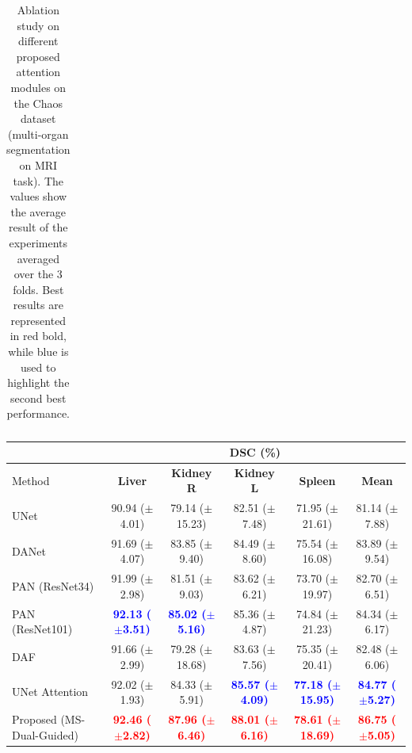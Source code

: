 \documentclass[journal]{IEEEtran}
\begin{document}
\begin{table}[ht!]
\begin{tabular}{lcccc|c}
\midrule
\end{tabular}
\caption{Ablation study on different proposed attention modules on the Chaos dataset (multi-organ segmentation on MRI task). The values show the average result of the experiments averaged over the 3 folds. Best results are represented in red bold, while blue is used to highlight the second best performance.}
\label{table:metrics_ablation_supplemental}
\end{table}

\begin{table}[t!]
\centering
\scriptsize
\begin{tabular}{lcccc|c}\\
\toprule
 & \multicolumn{5}{c}{\textbf{DSC} (\%)}\\
 \midrule
Method & \textbf{Liver} & \textbf{Kidney R} & \textbf{Kidney L} & \textbf{Spleen} & \textbf{Mean}  \\
 \midrule
UNet \cite{ronneberger2015u}  & 90.94 ($\pm$4.01)  & 79.14 ($\pm$15.23) & 82.51 ($\pm$7.48) & 71.95 ($\pm$21.61) &  81.14 ($\pm$7.88) \\
DANet \cite{fu2018dual}  & 91.69  ($\pm$4.07) & 83.85 ($\pm$9.40)& 84.49 ($\pm$8.60) & 75.54 ($\pm$16.08)&  83.89 ($\pm$9.54)   \\
PAN (ResNet34) \cite{li2018pyramid}   & 91.99 ($\pm$2.98)  & 81.51 ($\pm$9.03) & 83.62 ($\pm$6.21) & 73.70 ($\pm$19.97) & 82.70 ($\pm$6.51) \\
PAN (ResNet101)\cite{li2018pyramid}   & \textcolor{blue}{\textbf{92.13 ($\pm$3.51)}}  & \textcolor{blue}{\textbf{85.02 ($\pm$5.16)}} & 85.36 ($\pm$4.87) & 74.84 ($\pm$21.23) & 84.34 ($\pm$6.17) \\
DAF \cite{wang18d}  &  91.66 ($\pm$2.99) & 79.28 ($\pm$18.68)& 83.63 ($\pm$7.56) &  75.35 ($\pm$20.41)&  82.48 ($\pm$6.06)   \\
UNet Attention \cite{schlemper2019attention}  &   92.02 ($\pm$1.93) & 84.33 ($\pm$5.91)&  \textcolor{blue}{\textbf{85.57 ($\pm$4.09)}} & \textcolor{blue}{\textbf{77.18 ($\pm$15.95)}} &  \textcolor{blue}{\textbf{84.77 ($\pm$5.27)}}   \\
Proposed (MS-Dual-Guided)  & \textcolor{red}{\textbf{92.46 ($\pm$2.82)}}  & \textcolor{red}{\textbf{87.96 ($\pm$6.46)}}& \textcolor{red}{\textbf{88.01 ($\pm$6.16)}}  & \textcolor{red}{\textbf{78.61 ($\pm$18.69)}} &  \textcolor{red}{\textbf{86.75 ($\pm$5.05)}}\\


\end{tabular}
\end{table}
\end{document}
